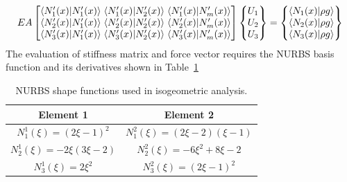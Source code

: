 \documentclass[submit,12pt]{aiaa-pretty} %
\begin{document}
\begin{equation}\nonumber
  \setlength\arraycolsep{1.5pt}
                        {EA}
                        \begin{bmatrix}
                          \left \langle {\color{black}{N_1^\prime(x)}} \vert {\color{black}{N_1^\prime(x)}} \right \rangle &  \left \langle {\color{black}{N_1^\prime(x)}} \vert {\color{black}{N_2^\prime(x)}} \right \rangle & \left \langle {\color{black}{N_1^\prime(x)}} \vert {\color{black}{N_m^\prime(x)}} \right \rangle \\
                          \left \langle {\color{black}{N_2^\prime(x)}} \vert {\color{black}{N_1^\prime(x)}} \right \rangle &  \left \langle {\color{black}{N_2^\prime(x)}} \vert {\color{black}{N_2^\prime(x)}} \right \rangle & \left \langle {\color{black}{N_2^\prime(x)}} \vert {\color{black}{N_m^\prime(x)}} \right \rangle \\
                          \left \langle {\color{black}{N_3^\prime(x)}} \vert {\color{black}{N_1^\prime(x)}} \right \rangle &  \left \langle {\color{black}{N_3^\prime(x)}} \vert {\color{black}{N_2^\prime(x)}} \right \rangle & \left \langle {\color{black}{N_3^\prime(x)}} \vert {\color{black}{N_m^\prime(x)}} \right \rangle \\
                        \end{bmatrix}
                        \begin{Bmatrix}
                          U_1 \\
                          U_2 \\
                          U_3 \\
                        \end{Bmatrix}=
                        \begin{Bmatrix}
                          \left \langle {\color{black}{N_1(x)}} \vert {\color{black}{\rho g}} \right \rangle \\
                          \left \langle {\color{black}{N_2(x)}} \vert {\color{black}{\rho g}} \right \rangle \\
                          \left \langle {\color{black}{N_3(x)}} \vert {\color{black}{\rho g}} \right \rangle \\ 
                        \end{Bmatrix}    
\end{equation}
The evaluation of stiffness matrix and force vector requires the NURBS
basis function and its derivatives shown in
Table~\ref{tab:anlytical-form-of-nurbs-functions}
\begin{table}
  \centering
  \caption{NURBS shape functions used in isogeometric analysis.}
  \label{tab:anlytical-form-of-nurbs-functions}
  \begin{tabular}{cc}
    \hline
    Element 1 & Element 2 \\
    \hline
    $N_1^1(\xi) =  (2 \xi -1)^2$ & $N_1^2(\xi) = (2\xi-2)(\xi-1)$  \\
    $N_2^1(\xi) = -2\xi(3\xi-2)$ & $N_2^2(\xi) = -6\xi^2 + 8\xi -2$ \\
    $N_3^1(\xi) =  2\xi^2$       & $N_3^2(\xi) = (2\xi -1)^2$ \\
    \hline
  \end{tabular}
\end{table}
\end{document}

